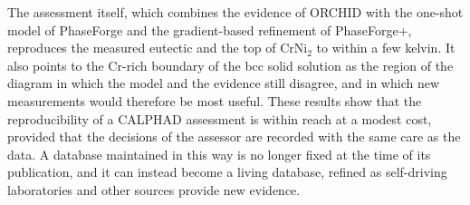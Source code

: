 The assessment itself, which combines the evidence of ORCHID with the one-shot model of PhaseForge and the gradient-based refinement of PhaseForge+, reproduces the measured eutectic and the top of CrNi$_2$ to within a few kelvin. It also points to the Cr-rich boundary of the bcc solid solution as the region of the diagram in which the model and the evidence still disagree, and in which new measurements would therefore be most useful. These results show that the reproducibility of a CALPHAD assessment is within reach at a modest cost, provided that the decisions of the assessor are recorded with the same care as the data. A database maintained in this way is no longer fixed at the time of its publication, and it can instead become a living database, refined as self-driving laboratories and other sources provide new evidence.
